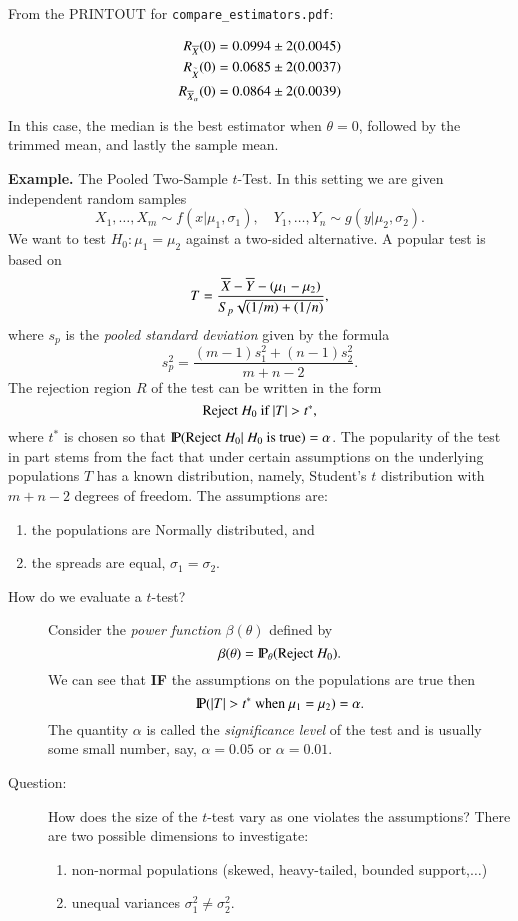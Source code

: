 \documentclass[captions=tableheading]{scrbook}
\begin{document}
From the PRINTOUT for \texttt{compare\_estimators.pdf}:

\begin{align*}
R_{\Xbar}(0) & = 0.0994 \pm2 (0.0045) \\
R_{\overset{\sim}{X}}(0) & = 0.0685 \pm2 (0.0037) \\
R_{\Xbar_{\alpha}}(0) & = 0.0864 \pm2 (0.0039)
\end{align*}

In this case, the median is the best estimator when $\theta=0$, followed by the trimmed mean, and lastly the sample mean.  

\bigskip

\textbf{Example.} The Pooled Two-Sample $t$-Test.
In this setting we are given independent random samples
\[
X_{1},\ldots,X_{m}\sim f(x|\mu_{1},\sigma_{1}),\quad Y_{1},\ldots,Y_{n}\sim g(y|\mu_{2},\sigma_{2}).
\]
We want to test $H_{0}:\mu_{1}=\mu_{2}$ against a two-sided alternative. A popular test is based on 
\[
T=\frac{\Xbar-\overline{Y}-(\mu_{1}-\mu_{2})}{S_{p}\sqrt{(1/m)+(1/n)}},
\]
where $s_{p}$ is the \emph{pooled standard deviation} given by the
formula 
\[
s_{p}^{2}=\frac{(m-1)s_{1}^{2}+(n-1)s_{2}^{2}}{m+n-2}.
\]
 The rejection region $R$ of the test can be written in the form
\[
\mbox{Reject \ensuremath{H_{0}} if \ensuremath{|T|>t^{\ast}}},
\]
where $t^{\ast}$ is chosen so that $\P(\mbox{Reject \ensuremath{H_{0}}}|\mbox{ \ensuremath{H_{0}} is true})=\alpha$. The popularity of the test in part stems from the fact that under certain assumptions on the underlying populations $T$ has a known distribution, namely, Student's $t$ distribution with $m+n-2$ degrees of freedom. The assumptions are:

\begin{enumerate}
\item the populations are Normally distributed, and
\item the spreads are equal, $\sigma_{1}=\sigma_{2}$.
\end{enumerate}


\begin{description}
\item[How do we evaluate a $t$-test?] Consider the \emph{power function} $\beta(\theta)$ defined by 
  \[
  \beta(\theta)=\P_{\theta}(\mbox{Reject \ensuremath{H_{0}}}).
  \]
  We can see that \textbf{IF} the assumptions on the populations are true then 
  \[
  \P(|T|>t^{\ast}\mbox{ when \ensuremath{\mu_{1}=\mu_{2}}})=\alpha.
  \]
  The quantity $\alpha$ is called the \emph{significance level} of the test and is usually some small number, say, $\alpha=0.05$ or $\alpha=0.01$.
\item[Question:] How does the size of the $t$-test vary as one violates the assumptions? There are two possible dimensions to investigate:
\begin{enumerate}
\item non-normal populations (skewed, heavy-tailed, bounded support,$\ldots$)
\item unequal variances $\sigma_{1}^{2}\neq\sigma_{2}^{2}$.
\end{enumerate}
\end{description}
\end{document}
